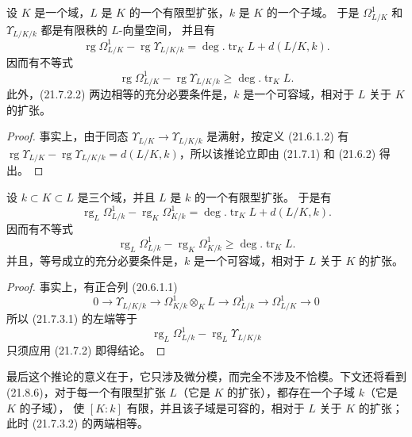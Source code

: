 \begin{corollary}[21.7.2]
\label{0.21.7.2-fr}
设 $K$ 是一个域，$L$ 是 $K$ 的一个有限型扩张，$k$ 是 $K$ 的一个子域。
于是 $\Omega^1_{L/K}$ 和 $\Upsilon_{L/K/k}$ 都是有限秩的 $L$-向量空间，
并且有
\begin{equation}
\tag{21.7.2.1}
\label{0.21.7.2.1-fr}
\operatorname{rg}\Omega^1_{L/K}-\operatorname{rg}\Upsilon_{L/K/k}
=\deg.\operatorname{tr}_K L+d(L/K,k).
\end{equation}
因而有不等式
\begin{equation}
\tag{21.7.2.2}
\label{0.21.7.2.2-fr}
\operatorname{rg}\Omega^1_{L/K}-\operatorname{rg}\Upsilon_{L/K/k}
\geqslant\deg.\operatorname{tr}_K L.
\end{equation}
此外，(21.7.2.2) 两边相等的充分必要条件是，$k$ 是一个可容域，相对于
$L$ 关于 $K$ 的扩张。
\end{corollary}

\begin{proof}
事实上，由于同态
$\Upsilon_{L/K}\to\Upsilon_{L/K/k}$ 是满射，按定义 (21.6.1.2) 有
$\operatorname{rg}\Upsilon_{L/K}-\operatorname{rg}\Upsilon_{L/K/k}
=d(L/K,k)$，所以该推论立即由 (21.7.1) 和 (21.6.2) 得出。
\end{proof}

\begin{corollary}[21.7.3]
\label{0.21.7.3-fr}
设 $k\subset K\subset L$ 是三个域，并且 $L$ 是 $k$ 的一个有限型扩张。
于是有
\begin{equation}
\tag{21.7.3.1}
\label{0.21.7.3.1-fr}
\operatorname{rg}_L\Omega^1_{L/k}-\operatorname{rg}_K\Omega^1_{K/k}
=\deg.\operatorname{tr}_K L+d(L/K,k).
\end{equation}
因而有不等式
\begin{equation}
\tag{21.7.3.2}
\label{0.21.7.3.2-fr}
\operatorname{rg}_L\Omega^1_{L/k}-\operatorname{rg}_K\Omega^1_{K/k}
\geqslant\deg.\operatorname{tr}_K L.
\end{equation}
并且，等号成立的充分必要条件是，$k$ 是一个可容域，相对于 $L$ 关于 $K$
的扩张。
\end{corollary}

\begin{proof}
事实上，有正合列 (20.6.1.1)
\[
0\to\Upsilon_{L/K/k}\to\Omega^1_{K/k}\otimes_KL\to\Omega^1_{L/k}
\to\Omega^1_{L/K}\to0
\]
所以 (21.7.3.1) 的左端等于
\[
\operatorname{rg}_L\Omega^1_{L/k}-\operatorname{rg}_L\Upsilon_{L/K/k}
\]
只须应用 (21.7.2) 即得结论。
\end{proof}

最后这个推论的意义在于，它只涉及微分模，而完全不涉及不恰模。下文还将看到
(21.8.6)，对于每一个有限型扩张 $L$（它是 $K$ 的扩张），都存在一个子域
$k$（它是 $K$ 的子域），
使 $[K:k]$ 有限，并且该子域是可容的，相对于 $L$ 关于 $K$ 的扩张；此时
(21.7.3.2) 的两端相等。

